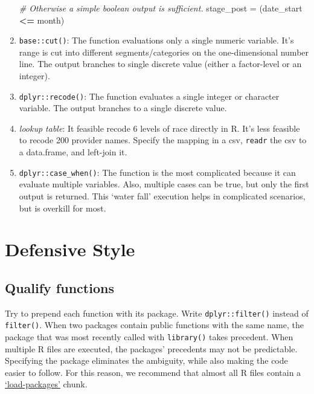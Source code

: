 \documentclass[
]{book}
\newenvironment{Shaded}{\begin{snugshade}}{\end{snugshade}}
\newcommand{\CommentTok}[1]{\textcolor[rgb]{0.56,0.35,0.01}{\textit{#1}}}
\newcommand{\NormalTok}[1]{#1}
\newcommand{\OperatorTok}[1]{\textcolor[rgb]{0.81,0.36,0.00}{\textbf{#1}}}
\newcommand{\StringTok}[1]{\textcolor[rgb]{0.31,0.60,0.02}{#1}}
\begin{document}
\begin{enumerate}
\begin{Shaded}
\begin{Highlighting}[]
\CommentTok{\# Otherwise a simple boolean output is sufficient.}
\NormalTok{stage\_post  =}\StringTok{ }\NormalTok{(date\_start }\OperatorTok{<=}\StringTok{ }\NormalTok{month)}
\end{Highlighting}
\end{Shaded}
\item
  \texttt{base::cut()}: The function evaluations only a single numeric variable. It's range is cut into different segments/categories on the one-dimensional number line. The output branches to single discrete value (either a factor-level or an integer).
\item
  \texttt{dplyr::recode()}: The function evaluates a single integer or character variable. The output branches to a single discrete value.
\item
  \emph{lookup table}: It feasible recode 6 levels of race directly in R. It's less feasible to recode 200 provider names. Specify the mapping in a csv, \texttt{readr} the csv to a data.frame, and left-join it.
\item
  \texttt{dplyr::case\_when()}: The function is the most complicated because it can evaluate multiple variables. Also, multiple cases can be true, but only the first output is returned. This `water fall' execution helps in complicated scenarios, but is overkill for most.
\end{enumerate}

\hypertarget{defensive-style}{%
\section{Defensive Style}\label{defensive-style}}

\hypertarget{qualify-functions}{%
\subsection{Qualify functions}\label{qualify-functions}}

Try to prepend each function with its package. Write \texttt{dplyr::filter()} instead of \texttt{filter()}. When two packages contain public functions with the same name, the package that was most recently called with \texttt{library()} takes precedent. When multiple R files are executed, the packages' precedents may not be predictable. Specifying the package eliminates the ambiguity, while also making the code easier to follow. For this reason, we recommend that almost all R files contain a \protect\hyperlink{chunk-load-packages}{`load-packages'} chunk.
\end{document}
